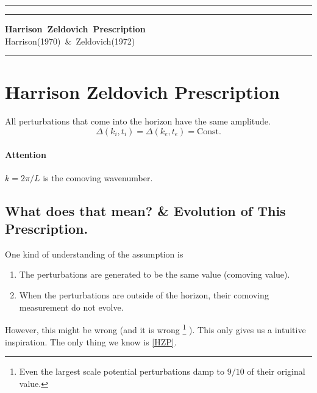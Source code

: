 \documentclass{article}
\begin{document}




\hrule\vspace{1pt}\hrule
\begin{center}
\mbox{{\bf Harrison Zeldovich Prescription}} \\
\vspace{0.5em}
\mbox{{Harrison(1970) \& Zeldovich(1972)}}
\end{center}
\hrule



\section{Harrison Zeldovich Prescription}
All perturbations that come into the horizon have the same amplitude.
\begin{equation}
\Delta(k_i,t_i)=\Delta(k_e,t_e)=\text{Const.} \label{HZP}
\end{equation}

\paragraph{Attention} $k=2\pi/L$ is the comoving wavenumber.







\subsection{What does that mean? \& Evolution of This Prescription.}

One kind of understanding of the assumption is
\begin{enumerate}
\item
The perturbations are generated to be the same value (comoving value).

\item
When the perturbations are outside of the horizon, their comoving measurement do not evolve.

\end{enumerate}

However, this might be wrong (and it is wrong
\footnote{Even the largest scale potential perturbations damp to $9/10$ of their original value.}
). This only gives us a intuitive inspiration. The only thing we know is \ref{HZP}.
\end{document}
